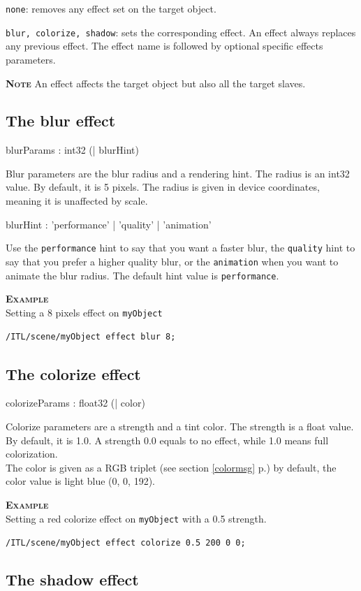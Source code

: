\documentclass[a4paper,twoside]{report}
\newcommand{\subsublevel}[1]	{\subsection{#1}}
\newcommand{\fullref}[1]	{\ref{#1} p.\pageref{#1}}
\newcommand{\OSC}[1]		{\texttt{#1}}
\newcommand{\example}		{\textbf{\hspace{-1.5cm}\textbf{\textsc{Example }}}}
\newcommand{\note}	[1]		{\vspace{2mm}\textbf{\hspace{-1.03cm}\textbf{\textsc{Note #1}}}}
\let\olditemize\itemize
\let\oldenditemize\enditemize
\renewenvironment{itemize} 	{\olditemize \setlength{\itemsep}{1mm}}{\oldenditemize}
\newcommand{\sample}	[1]			{\vspace{-2mm}\begin{center}\colorbox{mygrey}{
								\begin{minipage}[t]{0.9\columnwidth} 
								{\small \texttt{#1}}
								\end{minipage}}\end{center}}
\begin{document}
\begin{itemize}
\item \OSC{none}: removes any effect set on the target object.
\item \OSC{blur, colorize, shadow}: sets the corresponding effect. An effect always replaces any previous effect. The effect name is followed by optional specific effects parameters.
\end{itemize}

\note{} An effect affects the target object but also all the target slaves.

\subsublevel{The blur effect}

\begin{rail}
blurParams : int32 (| blurHint)
\end{rail}

Blur parameters are the blur radius and a rendering hint. The radius is an int32 value. By default, it is 5 pixels. The radius is given in device coordinates, meaning it is unaffected by scale. 

\begin{rail}
blurHint : 'performance' | 'quality' | 'animation'
\end{rail}
Use the \OSC{performance} hint to say that you want a faster blur, the \OSC{quality} hint to say that you prefer a higher quality blur, or the \OSC{animation} when you want to animate the blur radius. The default hint value is \OSC{performance}.

\example \\
Setting a 8 pixels effect on \OSC{myObject}
\sample{/ITL/scene/myObject effect blur 8;}

\subsublevel{The colorize effect}

\begin{rail}
colorizeParams : float32 (| color)
\end{rail}

Colorize parameters are a strength and a tint color. The strength is a float value. By default, it is 1.0. A strength 0.0 equals to no effect, while 1.0 means full colorization. \\
The color is given as a RGB triplet (see section \fullref{colormsg}) by default, the color value is light blue (0, 0, 192).

\example \\
Setting a red colorize effect on \OSC{myObject} with a 0.5 strength.
\sample{/ITL/scene/myObject effect colorize 0.5 200 0 0;}


\subsublevel{The shadow effect}
\end{document}

